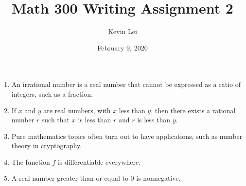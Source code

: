 \documentclass{article}
\title{Math 300 Writing Assignment 2}
\author{Kevin Lei}
\date{February 9, 2020}
\begin{document}
\maketitle
\begin{enumerate}[1.]
    \item An irrational number is a real number that cannot be expressed as a ratio of integers, such as a fraction.
    \item If $x$ and $y$ are real numbers, with $x$ less than $y$, then there exists a rational number $r$ such that $x$ is less than $r$ and $r$ is less than $y$.
    \item Pure mathematics topics often turn out to have applications, such as number theory in cryptography.
    \item The function $f$ is differentiable everywhere.
    \item A real number greater than or equal to 0 is nonnegative.
\end{enumerate}
\end{document}
